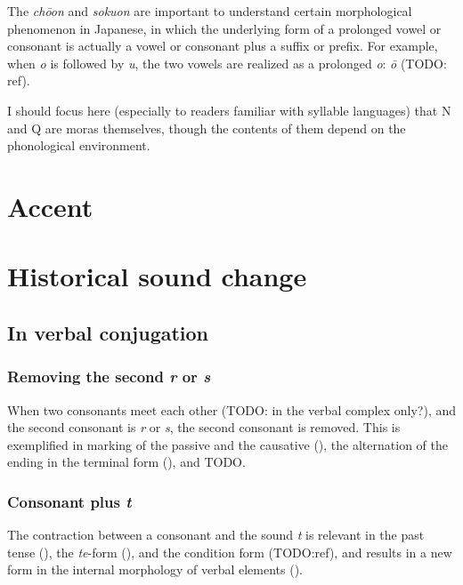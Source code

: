 \documentclass[UTF8, a4paper, oneside, scheme=plain]{ctexrep}
\newcommand{\corpus}[1]{\emph{#1}}
\begin{document}
The \corpus{ch\={o}on} and \corpus{sokuon} are important to understand 
certain morphological phenomenon in Japanese,
in which the underlying form of a prolonged vowel or consonant 
is actually a vowel or consonant plus a suffix or prefix.
For example, when \corpus{o} is followed by \corpus{u}, 
the two vowels are realized as a prolonged \corpus{o}: \corpus{\={o}}
(TODO: ref).

I should focus here (especially to readers familiar with syllable languages)
that N and Q are moras themselves,
though the contents of them depend on the phonological environment.

\section{Accent}

\section{Historical sound change}

\subsection{In verbal conjugation}

\subsubsection{Removing the second \corpus{r} or \corpus{s}}\label{sec:removing-rs}

When two consonants meet each other (TODO: in the verbal complex only?),
and the second consonant is \corpus{r} or \corpus{s},
the second consonant is removed.
This is exemplified in marking of the passive and the causative (),
the alternation of the ending in the terminal form (),
and TODO.

\subsubsection{Consonant plus \corpus{t}}\label{sec:t-euphonic}

The contraction between a consonant and the sound \corpus{t} is relevant in 
the past tense (),
the \corpus{te}-form (),
and the condition form (TODO:ref),
and results in a new form in the internal morphology of verbal elements ().
\end{document}
